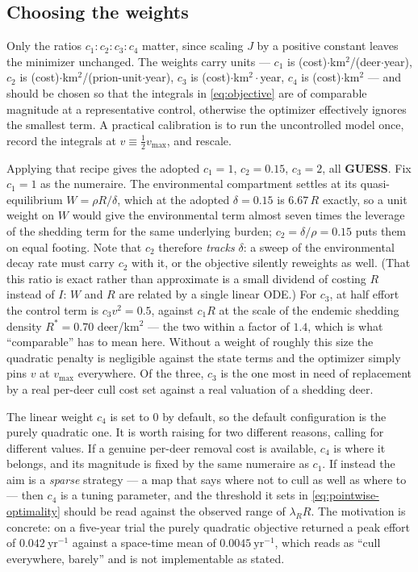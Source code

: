 \documentclass[11pt]{article}
\newcommand{\tagGUESS}{{\footnotesize\textsf{\textbf{\textcolor{red!70!black}{GUESS}}}}}
\begin{document}
\subsection{Choosing the weights}
\label{sec:control-weights}

Only the ratios $c_1:c_2:c_3:c_4$ matter, since scaling $J$ by a positive constant leaves the minimizer unchanged. The weights carry units --- $c_1$ is (cost)$\cdot$km$^2$/(deer$\cdot$year), $c_2$ is (cost)$\cdot$km$^2$/(prion-unit$\cdot$year), $c_3$ is (cost)$\cdot$km$^2\cdot$year, $c_4$ is (cost)$\cdot$km$^2$ --- and should be chosen so that the integrals in \eqref{eq:objective} are of comparable magnitude at a representative control, otherwise the optimizer effectively ignores the smallest term. A practical calibration is to run the uncontrolled model once, record the integrals at $v\equiv \tfrac12 v_{\max}$, and rescale.

Applying that recipe gives the adopted $c_1 = 1$, $c_2 = 0.15$, $c_3 = 2$, all \tagGUESS{}. Fix $c_1 = 1$ as the numeraire. The environmental compartment settles at its quasi-equilibrium $W = \rho R/\delta$, which at the adopted $\delta = 0.15$ is $6.67\,R$ exactly, so a unit weight on $W$ would give the environmental term almost seven times the leverage of the shedding term for the same underlying burden; $c_2 = \delta/\rho = 0.15$ puts them on equal footing. Note that $c_2$ therefore \emph{tracks} $\delta$: a sweep of the environmental decay rate must carry $c_2$ with it, or the objective silently reweights as well. (That this ratio is exact rather than approximate is a small dividend of costing $R$ instead of $I$: $W$ and $R$ are related by a single linear ODE.) For $c_3$, at half effort the control term is $c_3 v^2 = 0.5$, against $c_1 R$ at the scale of the endemic shedding density $R^* = 0.70$ deer/km$^2$ --- the two within a factor of $1.4$, which is what ``comparable'' has to mean here. Without a weight of roughly this size the quadratic penalty is negligible against the state terms and the optimizer simply pins $v$ at $v_{\max}$ everywhere. Of the three, $c_3$ is the one most in need of replacement by a real per-deer cull cost set against a real valuation of a shedding deer.

The linear weight $c_4$ is set to $0$ by default, so the default configuration is the purely quadratic one. It is worth raising for two different reasons, calling for different values. If a genuine per-deer removal cost is available, $c_4$ is where it belongs, and its magnitude is fixed by the same numeraire as $c_1$. If instead the aim is a \emph{sparse} strategy --- a map that says where not to cull as well as where to --- then $c_4$ is a tuning parameter, and the threshold it sets in \eqref{eq:pointwise-optimality} should be read against the observed range of $\lambda_R R$. The motivation is concrete: on a five-year trial the purely quadratic objective returned a peak effort of $0.042\ \mathrm{yr}^{-1}$ against a space-time mean of $0.0045\ \mathrm{yr}^{-1}$, which reads as ``cull everywhere, barely'' and is not implementable as stated.
\end{document}
